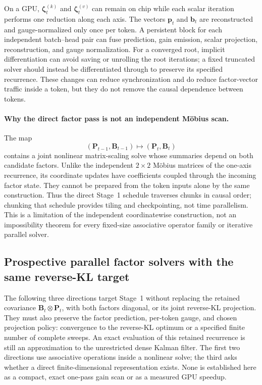 \documentclass[11pt]{article}
\newcommand{\ve}[1]{\boldsymbol{#1}}
\begin{document}
On a GPU, $\ve{\zeta}^{(k)}_t$ and $\ve{\zeta}^{(v)}_t$ can remain on chip while each scalar
iteration performs one reduction along each axis.  The vectors $\ve{p}_t$ and $\ve{b}_t$ are
reconstructed and gauge-normalized only once per token.  A persistent block for each independent
batch--head pair can fuse prediction, gain emission, scalar projection, reconstruction, and gauge
normalization.  For a converged root, implicit differentiation can avoid saving or unrolling the
root iterations; a fixed truncated solver should instead be differentiated through to preserve
its specified recurrence.  These changes can reduce synchronization and do reduce factor-vector
traffic inside a token, but they do not remove the causal dependence between tokens.

\paragraph{Why the direct factor pass is not an independent M\"obius scan.}
The map
\begin{equation}
  (\ve{P}_{t-1},\ve{B}_{t-1})
  \longmapsto
  (\ve{P}_t,\ve{B}_t)
  \label{eq:kdn2-chunk-factor-map}
\end{equation}
contains a joint nonlinear matrix-scaling solve whose summaries depend on both candidate factors.
Unlike the independent $2\times2$ M\"obius matrices of the one-axis recurrence, its coordinate
updates have coefficients coupled through the incoming factor state.  They cannot be prepared
from the token inputs alone by the same construction.  Thus the direct Stage~1 schedule traverses
chunks in causal order; chunking that schedule provides tiling and checkpointing, not time
parallelism.  This is a limitation of the independent coordinatewise construction, not an
impossibility theorem for every fixed-size associative operator family or iterative parallel
solver.

\subsection{Prospective parallel factor solvers with the same reverse-KL target}
\label{app:kdn2-parallel-factor-solvers}

The following three directions target Stage~1 without replacing the retained covariance
$\ve{B}_t\otimes\ve{P}_t$, with both factors diagonal, or its joint reverse-KL projection.
They must also preserve the factor prediction, per-token gauge, and chosen projection policy:
convergence to the reverse-KL optimum or a specified finite number of complete sweeps.  An exact
evaluation of this retained recurrence is still an approximation to the unrestricted dense
Kalman filter.  The first two directions use associative operations inside a nonlinear solve;
the third asks whether a direct finite-dimensional representation exists.  None is established
here as a compact, exact one-pass gain scan or as a measured GPU speedup.
\end{document}
